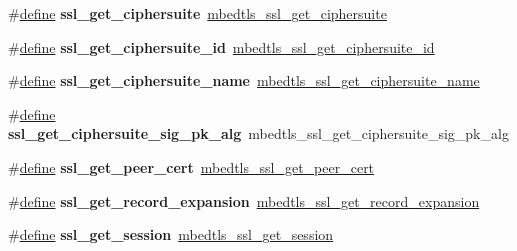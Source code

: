 \begin{DoxyCompactItemize}
\item 
\mbox{\label{compat-1_83_8h_a9116daf1f31763fbf6f19debecd5b2cc}} 
\#\hyperlink{structdefine}{define} {\bfseries ssl\+\_\+get\+\_\+ciphersuite}~\hyperlink{ssl_8h_a18739598df499461369020b8ea6fff1c}{mbedtls\+\_\+ssl\+\_\+get\+\_\+ciphersuite}
\item 
\mbox{\label{compat-1_83_8h_a553b7c0ab616f647cb2da1843daf46b2}} 
\#\hyperlink{structdefine}{define} {\bfseries ssl\+\_\+get\+\_\+ciphersuite\+\_\+id}~\hyperlink{ssl_8h_a9914cdf5533e813e1ea7ca52981aa006}{mbedtls\+\_\+ssl\+\_\+get\+\_\+ciphersuite\+\_\+id}
\item 
\mbox{\label{compat-1_83_8h_afaa02c1f2a377fcd218bf3254ca8158e}} 
\#\hyperlink{structdefine}{define} {\bfseries ssl\+\_\+get\+\_\+ciphersuite\+\_\+name}~\hyperlink{ssl_8h_ada9a0169e4712521049117d29b91e1e5}{mbedtls\+\_\+ssl\+\_\+get\+\_\+ciphersuite\+\_\+name}
\item 
\mbox{\label{compat-1_83_8h_ab2eee60456eba9b5c1da2a6b6fbee1e2}} 
\#\hyperlink{structdefine}{define} {\bfseries ssl\+\_\+get\+\_\+ciphersuite\+\_\+sig\+\_\+pk\+\_\+alg}~mbedtls\+\_\+ssl\+\_\+get\+\_\+ciphersuite\+\_\+sig\+\_\+pk\+\_\+alg
\item 
\mbox{\label{compat-1_83_8h_a50479818ce5730ec54c056a82c00ecbf}} 
\#\hyperlink{structdefine}{define} {\bfseries ssl\+\_\+get\+\_\+peer\+\_\+cert}~\hyperlink{ssl_8h_aa7ab0ac8d8341063a0f815ee99337831}{mbedtls\+\_\+ssl\+\_\+get\+\_\+peer\+\_\+cert}
\item 
\mbox{\label{compat-1_83_8h_a66b2bbe8af1bb0163c1bd4a3a28102cc}} 
\#\hyperlink{structdefine}{define} {\bfseries ssl\+\_\+get\+\_\+record\+\_\+expansion}~\hyperlink{ssl_8h_a935f3ebfb31f988e24a8bf9bcb0fd26b}{mbedtls\+\_\+ssl\+\_\+get\+\_\+record\+\_\+expansion}
\item 
\mbox{\label{compat-1_83_8h_aca3ff78e38738b7d4b66ae18d2b0925d}} 
\#\hyperlink{structdefine}{define} {\bfseries ssl\+\_\+get\+\_\+session}~\hyperlink{ssl_8h_ad617a178adfaf259db89c4fe092ad6e1}{mbedtls\+\_\+ssl\+\_\+get\+\_\+session}
\item 
\mbox{\label{compat-1_83_8h_a3e280cfb190f6bb63189589ee99c4ea5}} 

\end{DoxyCompactItemize}
